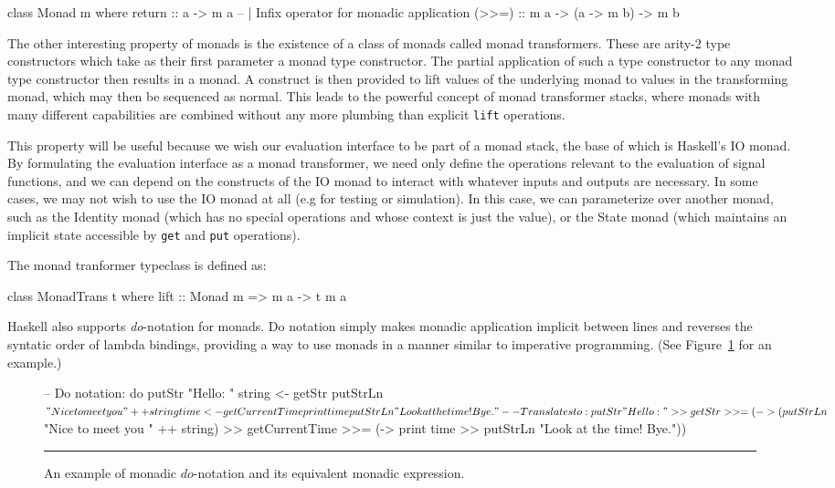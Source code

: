 \begin{code}
class Monad m where
  return :: a -> m a
  -- | Infix operator for monadic application
  (>>=)  :: m a -> (a -> m b) -> m b 
\end{code}

The other interesting property of monads is the existence of a class of monads
called monad transformers. These are arity-2 type constructors which take as
their first parameter a monad type constructor. The partial application of
such a type constructor to any monad type constructor then results in a monad.
A construct is then provided to lift values of the underlying monad to values
in the transforming monad, which may then be sequenced as normal. This leads
to the powerful concept of monad transformer stacks, where monads with many
different capabilities are combined without any more plumbing than explicit
{\tt lift} operations. 

This property will be useful because we wish our evaluation interface to be
part of a monad stack, the base of which is Haskell's IO monad. By formulating
the evaluation interface as a monad transformer, we need only define the
operations relevant to the evaluation of signal functions, and we can depend
on the constructs of the IO monad to interact with whatever inputs and outputs
are necessary. In some cases, we may not wish to use the IO monad at all (e.g
for testing or simulation). In this case, we can parameterize over another
monad, such as the Identity monad (which has no special operations and whose
context is just the value), or the State monad (which maintains an implicit 
state accessible by {\tt get} and {\tt put} operations).

The monad tranformer typeclass is defined as:

\begin{code}
class MonadTrans t where
  lift :: Monad m => m a -> t m a
\end{code}

Haskell also supports {\em do}-notation for monads. Do notation simply
makes monadic application implicit between lines and reverses the syntatic
order of lambda bindings, providing a way to use monads in a manner similar
to imperative programming. (See Figure~\ref{figure:monad-example} for an
example.)

\begin{figure}
\begin{code}
-- Do notation:
do putStr "Hello: "
   string <- getStr
   putStrLn $ "Nice to meet you " ++ string
   time <- getCurrentTime
   print time
   putStrLn "Look at the time! Bye."

-- Translates to:
putStr "Hello: " >> getStr >>= 
(\string -> (putStrLn $ "Nice to meet you " ++ string) >>
 getCurrentTime >>=
 (\time -> print time >> putStrLn "Look at the time! Bye."))
\end{code}
\hrule
\caption{An example of monadic $do$-notation and its equivalent monadic
expression.}
\label{figure:monad-example}
\end{figure}

